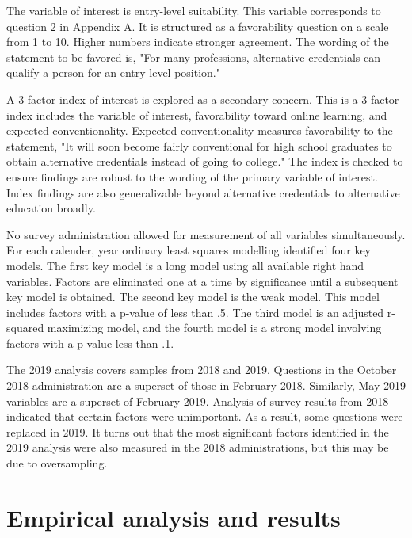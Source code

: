 \documentclass[review]{elsarticle}
\begin{document}
        The variable of interest is entry-level suitability.
        This variable corresponds to question 2 in Appendix A.
        It is structured as a favorability question on a scale from 1 to 10. Higher numbers indicate
        stronger agreement.
        The wording of the statement to be favored is,
        "For many professions, alternative credentials can qualify a person for an entry-level position."
        
        A 3-factor index of interest is explored as a secondary concern.
        This is a 3-factor index includes the variable of interest, favorability toward online learning,
        and expected conventionality.
        Expected conventionality measures favorability to the statement,
        "It will soon become fairly conventional for high school graduates to obtain alternative credentials
        instead of going to college."
        The index is checked to ensure findings are robust to the wording of the primary variable of interest.
        Index findings are also generalizable beyond alternative credentials to alternative education broadly.
        
        No survey administration allowed for measurement of all variables simultaneously.
        For each calender, year ordinary least squares modelling identified four key models.
        The first key model is a long model using all available right hand variables.
        Factors are eliminated one at a time by significance until a subsequent key model is obtained.
        The second key model is the weak model. This model includes factors with a p-value of less than .5.
        The third model is an adjusted r-squared maximizing model, and the fourth
        model is a strong model involving factors with a p-value less than .1.

        The 2019 analysis covers samples from 2018 and 2019.
        Questions in the October 2018 administration are a superset of those in February 2018.
        Similarly, May 2019 variables are a superset of February 2019.
        Analysis of survey results from 2018 indicated that certain factors were unimportant.
        As a result, some questions were replaced in 2019.
        It turns out that the most significant factors identified in the
        2019 analysis were also measured in the 2018 administrations, but this may be due to oversampling.

        \section{Empirical analysis and results}
\end{document}
